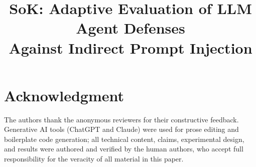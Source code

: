 \documentclass[conference]{IEEEtran}
\begin{document}
\title{SoK: Adaptive Evaluation of LLM Agent Defenses\\Against Indirect Prompt Injection}

\author{
	}

\IEEEoverridecommandlockouts
\makeatletter{}\makeatother
{}

\maketitle














\section*{Acknowledgment}
The authors thank the anonymous reviewers for their constructive feedback. Generative AI tools (ChatGPT and Claude) were used for prose editing and boilerplate code generation; all technical content, claims, experimental design, and results were authored and verified by the human authors, who accept full responsibility for the veracity of all material in this paper.



\end{document}
